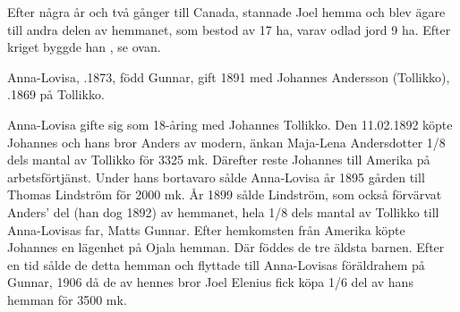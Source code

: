 %
Efter några år och två gånger till Canada, stannade Joel hemma och blev ägare till andra delen av hemmanet, som bestod av 17 ha, varav odlad jord 9 ha. Efter kriget byggde han , se ovan.



%


%
Anna-Lovisa, .1873, född Gunnar, gift 1891 med Johannes Andersson (Tollikko), .1869 på Tollikko.
\begin{jhchildren}
  \item {}
  \item {}
  \item {}
  \item {}
  \item {}
  \item {}
  \item {}
  \item {}
  \item {}
  \item {}
\end{jhchildren}
Anna-Lovisa gifte sig som 18-åring med Johannes Tollikko. Den 11.02.1892 köpte Johannes och hans bror Anders av modern, änkan Maja-Lena Andersdotter 1/8 dels mantal av Tollikko för 3325 mk. Därefter reste Johannes till Amerika på arbetsförtjänst. Under hans bortavaro sålde Anna-Lovisa år 1895 gården till Thomas Lindström för 2000 mk. År 1899 sålde Lindström, som också förvärvat Anders' del (han dog 1892) av hemmanet, hela 1/8 dels mantal av Tollikko till Anna-Lovisas far, Matts Gunnar.
Efter hemkomsten från Amerika köpte Johannes en lägenhet på Ojala hemman. Där föddes de tre äldsta barnen. Efter en tid sålde de detta hemman och flyttade till Anna-Lovisas föräldrahem på Gunnar, 1906 då de av hennes bror Joel Elenius fick köpa 1/6 del av hans hemman för 3500 mk.

